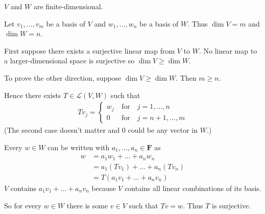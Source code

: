 \documentclass[a5paper]{article}
\begin{document}
\newcommand    \C          {\mathbf{C}}
\newcommand    \R          {\mathbf{R}}
\renewcommand  \L          {\mathcal{L}}
\newcommand    \F          {\mathbf{F}}
\renewcommand  \P          {\mathcal{P}}
\newcommand    \nullspace  {\text{null\;}}
\newcommand    \range      {\text{range\;}}
\newcommand    \linspan    {\text{span\;}}

    $V$ and $W$ are finite-dimensional.

    Let $v_1,\dots,v_m$ be a basis of $V$ and $w_1,\dots,w_n$ be a basis of $W$.
    Thus $\dim V = m$ and $\dim W = n$.

    First suppose there exists a surjective linear map from $V$ to $W$.
    No linear map to a larger-dimensional space is surjective so $\dim V \ge \dim W$.

    To prove the other direction, suppose $\dim V \ge \dim W$.
    Then $m \ge n$.

    Hence there exists $T \in \L(V,W)$ such that
\begin{align*}
        Tv_j =
            \begin{cases}
                    w_j \ &\text{for} \quad j = 1,\dots,n     \\
                    0   \ &\text{for} \quad j = n+1,\dots,m
            \end{cases}
\end{align*}
    (The second case doesn't matter and 0 could be any vector in $W$.)

    Every $w \in W$ can be written with $a_1,\dots,a_n \in \F$ as
\begin{align*}
        w   &= a_1w_1 + \dots + a_nw_n          \\
            &= a_1(Tv_1) + \dots + a_n(Tv_n)    \\
            &= T(a_1v_1 + \dots + a_nv_n)
\end{align*}
    $V$ contains $a_1v_1 + \dots + a_nv_n$ because $V$ contains all linear combinations of its basis.

    So for every $w \in W$ there is some $v \in V$ such that $Tv = w$.
    Thus $T$ is surjective.
\end{document}
